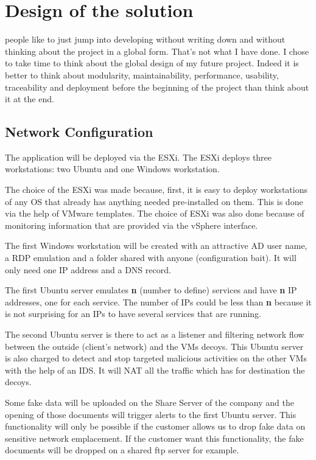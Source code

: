 \documentclass{tnreport}
\begin{document}
\cleardoublepage

\chapter{Design of the solution}\label{design}
 people like to just jump into developing without writing down and without thinking about the project in a global form. That's not what I have done. I chose to take time to think about the global design of my future project. Indeed it is better to think about modularity, maintainability, performance, usability, traceability and deployment before the beginning of the project than think about it at the end.

\section{Network Configuration}
The application will be deployed via the ESXi. The ESXi deploys three workstations: two Ubuntu and one Windows workstation.

The choice of the ESXi was made because, first, it is easy to deploy workstations of any OS that already has anything needed pre-installed on them. This is done via the help of VMware templates. The choice of ESXi was also done because of monitoring information that are provided via the vSphere interface.

The first Windows workstation will be created with an attractive AD user name, a RDP emulation and a folder shared with anyone (configuration bait). It will only need one IP address and a DNS record.

The first Ubuntu server emulates \textbf{n} (number to define) services and have \textbf{n} IP addresses, one for each service. The number of IPs could be less than \textbf{n} because it is not surprising for an IPs to have several services that are running.

The second Ubuntu server is there to act as a listener and filtering network flow between the outside (client's network) and the VMs decoys. This Ubuntu server is also charged to detect and stop targeted malicious activities on the other VMs with the help of an \gls{IDS}. It will NAT all the traffic which has for destination the decoys.

Some fake data will be uploaded on the Share Server of the company and the opening of those documents will trigger alerts to the first Ubuntu server. This functionality will only be possible if the customer allows us to drop fake data on sensitive network emplacement. If the customer want this functionality, the fake documents will be dropped on a shared ftp server for example.
\end{document}
